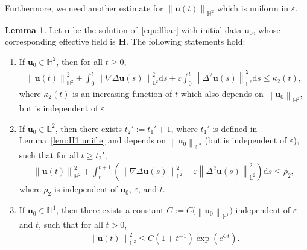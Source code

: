 \documentclass[11pt, reqno]{amsart}
\theoremstyle{definition}
\newtheorem{lemma}[theorem]{Lemma}
\numberwithin{equation}{section}
\newcommand{\bff}{\boldsymbol}
\newcommand{\bb}{\mathbb}
\newcommand{\ds}{\mathrm{d}s}
\newcommand{\norm}[2]{\left\|{#1}\right\|_{#2}}
\begin{document}
Furthermore, we need another estimate for $\norm{\bff{u}(t)}{\bb{H}^2}$ which is uniform in $\varepsilon$.

\begin{lemma}\label{lem:H2 unif}
Let $\bff{u}$ be the solution of~\eqref{equ:llbar} with initial data $\bff{u}_0$, whose corresponding effective field is $\bff{H}$. The following statements hold:
\begin{enumerate}
\item If $\bff{u}_0\in\bb{H}^2$, then for all $t\geq 0$,
\begin{align}\label{equ:et3}
    \norm{\bff{u}(t)}{\bb{H}^2}^2
    +
    \int_0^t \norm{\nabla \Delta \bff{u}(s)}{\bb{L}^2}^2 \ds 
    +
    \varepsilon \int_0^t \norm{\Delta^2 \bff{u}(s)}{\bb{L}^2}^2 \ds 
    \leq
    \kappa_2(t),
\end{align}
where $\kappa_2(t)$ is an increasing function of $t$ which also depends on $\norm{\bff{u}_0}{\bb{H}^2}$, but is independent of $\varepsilon$.
\item If $\bff{u}_0\in \bb{L}^2$, then there exists $t_2':=t_1'+1$, where $t_1'$ is defined in Lemma~\ref{lem:H1 unif e} and depends on $\norm{\bff{u}_0}{\bb{L}^2}$ (but is independent of $\varepsilon$), such that for all $t\geq t_2'$,
\begin{align}\label{equ:tt1 H2}
    \norm{\bff{u}(t)}{\bb{H}^2}^2 
    +
    \int_t^{t+1} \left( \norm{\nabla\Delta \bff{u}(s)}{\bb{L}^2}^2 + \varepsilon \norm{\Delta^2 \bff{u}(s)}{\bb{L}^2}^2 \right) \ds
    \leq
    \widetilde{\rho_2},
\end{align}
where $\rho_2$ is independent of $\bff{u}_0$, $\varepsilon$, and $t$.
\item If $\bff{u}_0\in \bb{H}^1$, then there exists a constant $C:=C\big(\norm{\bff{u}_0}{\bb{H}^1}\big)$ independent of $\varepsilon$ and $t$, such that for all $t>0$,
\begin{align}\label{equ:M unif}
    \norm{\bff{u}(t)}{\bb{H}^2}^2
    \leq
    C \left(1+t^{-1}\right) \exp(e^{Ct}).
\end{align}
\end{enumerate}
\end{lemma}
\end{document}
